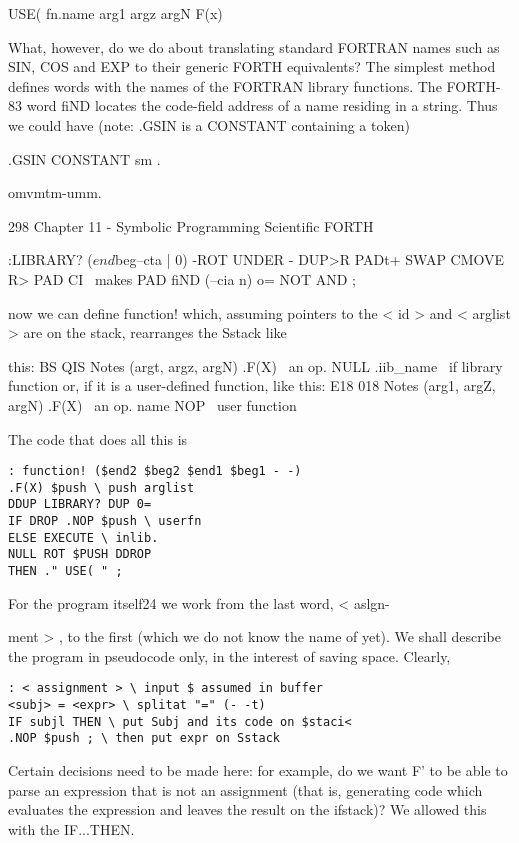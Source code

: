 USE( fn.name arg1 argz argN F(x)

What, however, do we do about translating standard FORTRAN
names such as SIN, COS and EXP to their generic FORTH
equivalents? The simplest method defines words with the names
of the FORTRAN library functions. The FORTH-83 word fiND
locates the code-field address of a name residing in a string. Thus
we could have (note: .GSIN is a CONSTANT containing a token)

.GSIN CONSTANT sm \etc.

omvmtm-umm.

298 Chapter 11 - Symbolic Programming Scientific FORTH

:LIBRARY? ($end$beg--cta | 0)
-ROT UNDER - DUP>R
PADt+ SWAP CMOVE R> PAD CI \ makes
PAD fiND (--cia n) o= NOT AND ;

now we can define function! which, assuming pointers to the
< id > and < arglist > are on the stack, rearranges the Sstack like

this:
BS QIS Notes
(argt, argz, argN) .F(X) \ an op.
NULL .iib\_name \ if library function
or, if it is a user-defined function, like this:
E18 018 Notes
(arg1, argZ, argN) .F(X) \ an op.
name NOP \ user function

The code that does all this is

\begin{lstlisting}
: function! ($end2 $beg2 $end1 $beg1 - -)
.F(X) $push \ push arglist
DDUP LIBRARY? DUP 0=
IF DROP .NOP $push \ userfn
ELSE EXECUTE \ inlib.
NULL ROT $PUSH DDROP
THEN ." USE( " ;
\end{lstlisting}

For the program itself24 we work from the last word, < aslgn-

ment > , to the first (which we do not know the name of yet).
We shall describe the program in pseudocode only, in the interest
of saving space. Clearly,

\begin{lstlisting}
: < assignment > \ input $ assumed in buffer
<subj> = <expr> \ splitat "=" (- -t)
IF subjl THEN \ put Subj and its code on $staci<
.NOP $push ; \ then put expr on Sstack
\end{lstlisting}

Certain decisions need to be made here: for example, do we want
F' to be able to parse an expression that is not an assignment (that
is, generating code which evaluates the expression and leaves the
result on the ifstack)? We allowed this with the IF...THEN.

